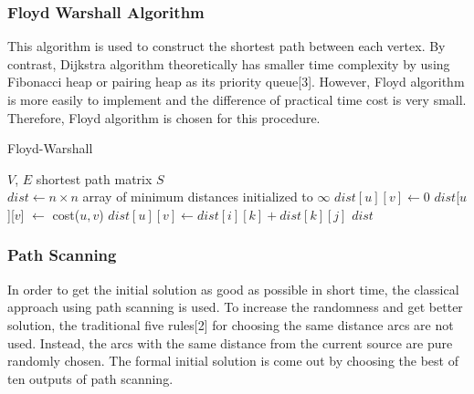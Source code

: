 \documentclass[9pt,shortpaper,twoside,web]{ieeecolor}
\begin{document}
\subsubsection{Floyd Warshall Algorithm}
This algorithm is used to construct the shortest path between each vertex. By contrast, Dijkstra algorithm theoretically 
has smaller time complexity by using Fibonacci heap or pairing heap as its priority queue[3]. However, Floyd algorithm is more easily to implement and the difference of practical time cost is very small. Therefore, Floyd algorithm is chosen for this procedure.
\begin{algorithm}
 \caption{Floyd-Warshall}
 \begin{algorithmic}[h]
 \renewcommand{\algorithmicrequire}{\textbf{Input:}}
 \renewcommand{\algorithmicensure}{\textbf{Output:}}
 \REQUIRE $V$, $E$
 \ENSURE  shortest path matrix $S$\\ 
 \STATE $dist \gets n\times n$ array of minimum distances initialized to $\infty$ 
 \STATE $dist[u][v]\gets 0$
 \ENDFOR 
 \STATE $dist$[$u$][$v$] $\gets$ cost($u,v$)
 \ENDFOR
 \STATE $dist[u][v]\gets dist[i][k]+dist[k][j]$  
 \ENDIF
 \ENDFOR
 \ENDFOR
 \ENDFOR
 \RETURN $dist$
 \end{algorithmic} 
 \end{algorithm}

\subsubsection{Path Scanning}
In order to get the initial solution as good as possible in short time, the classical approach using path scanning is used. To increase the randomness and get better solution, the traditional five rules[2] for choosing the same distance arcs are not used. Instead, the arcs with the same distance from the current source are pure randomly chosen. The formal initial solution is come out by choosing the best of ten outputs of path scanning.
\end{document}
